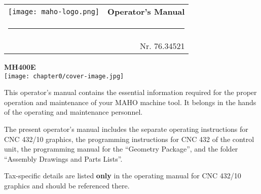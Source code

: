 
\thispagestyle{coverpage}

\begin{titlepage}
    \thispagestyle{coverpage}

    \vspace*{0cm}

    {\sffamily

        \noindent
        \begin{tabularx}{\textwidth}{X r}
            \texttt{[image: maho-logo.png]} &
            {\Huge \textbf{Operator's Manual}} \\
            \multicolumn{2}{l}{\rule{\textwidth}{0.4mm}} \\
            & {\normalsize Nr. 76.34521}
        \end{tabularx}

        \centering
        \vspace{2cm}

        {\fontsize{60pt}{62pt} \bfseries MH400E}\\[1cm]

        \texttt{[image: chapter0/cover-image.jpg]} 

        \vfill

         \noindent
         \begin{center}
             \parbox{\textwidth}{}
         \end{center}
    }
\end{titlepage}

\clearpage %
\pagestyle{fancy} %

\setcounter{chapter}{0}
\setcounter{section}{0}

This operator's manual contains the essential information required for the proper operation and maintenance of your MAHO machine tool. It belongs in the hands of the operating and maintenance personnel.

The present operator's manual includes the separate operating instructions for CNC 432/10 graphics, the programming instructions for CNC 432 of the control unit, the programming manual for the \enquote{Geometry Package}, and the folder \enquote{Assembly Drawings and Parts Lists}.

Tax-specific details are listed \textbf{only} in the operating manual for CNC 432/10 graphics and should be referenced there.


